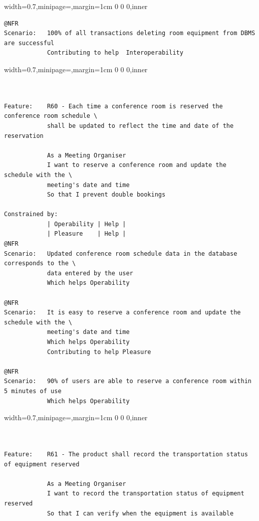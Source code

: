 \documentclass[dissertation,final]{softeng}
\newenvironment{featurecode}[1]
{ \lrbox\featurebox \begin{adjustbox}{width=#1\textwidth,minipage=\textwidth,margin=1cm 0 0 0,inner} }
{ \end{adjustbox}\endlrbox}
\newenvironment{featurelist}[2]
{
\newcommand{\setcaption}{\caption{#1}}
\newcommand{\setlabel}{\label{#2}}
}
{\begin{listing}[h!]\centering\usebox\featurebox\setcaption\setlabel\end{listing}}
\begin{document}
\begin{appendices}
\begin{featurelist}{R58 -- The product shall be able to delete room equipment}{lst:feature_r58}
\begin{featurecode}{0.7}
\begin{verbatim}
@NFR
Scenario:   100% of all transactions deleting room equipment from DBMS are successful
            Contributing to help  Interoperability
\end{verbatim}
\end{featurecode}
\end{featurelist}
\clearpage

\begin{featurelist}{R60 -- Each time a conference room is reserved the schedule shall be updated}{lst:feature_r60}
\begin{featurecode}{0.7}
\begin{verbatim}


Feature:    R60 - Each time a conference room is reserved the conference room schedule \
            shall be updated to reflect the time and date of the reservation

            As a Meeting Organiser
            I want to reserve a conference room and update the schedule with the \
            meeting's date and time
            So that I prevent double bookings

Constrained by:
            | Operability | Help |
            | Pleasure    | Help |
@NFR	
Scenario:   Updated conference room schedule data in the database corresponds to the \
            data entered by the user
            Which helps Operability

@NFR
Scenario:   It is easy to reserve a conference room and update the schedule with the \
            meeting's date and time
            Which helps Operability
            Contributing to help Pleasure

@NFR	
Scenario:   90% of users are able to reserve a conference room within 5 minutes of use
            Which helps Operability
\end{verbatim}
\end{featurecode}
\end{featurelist}

\begin{featurelist}{R61 -- The product shall record the transportation status of equipment reserved}{lst:feature_r61}
\begin{featurecode}{0.7}
\begin{verbatim}


Feature:    R61 - The product shall record the transportation status of equipment reserved

            As a Meeting Organiser
            I want to record the transportation status of equipment reserved
            So that I can verify when the equipment is available
	

\end{verbatim}
\end{featurecode}
\end{featurelist}
\end{appendices}
\end{document}
